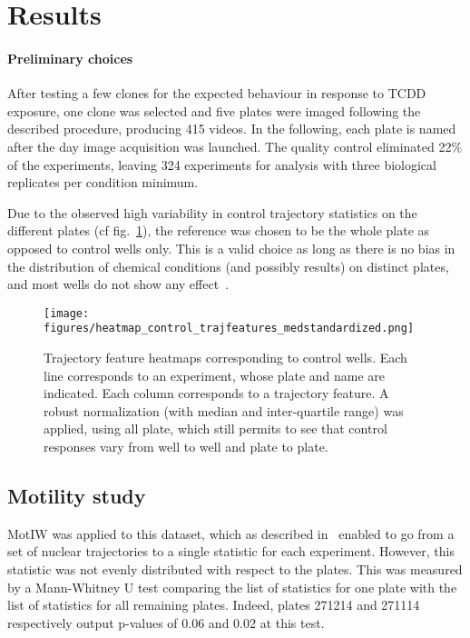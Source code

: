 \section{Results}
\paragraph{Preliminary choices}
After testing a few clones for the expected behaviour in response to TCDD exposure, one clone was selected and five plates were imaged following the described procedure, producing 415 videos. In the following, each plate is named after the day image acquisition was launched. The quality control eliminated 22\% of the experiments, leaving 324 experiments for analysis with three biological replicates per condition minimum.

Due to the observed high variability in control trajectory statistics on the different plates (cf fig.~\ref{control_heatmap}), the reference was chosen to be the whole plate as opposed to control wells only. This is a valid choice as long as there is no bias in the distribution of chemical conditions (and possibly results) on distinct plates, and most wells do not show any effect~\cite{pmid19644458}. 
\begin{figure}
\centering
\texttt{[image: figures/heatmap\_control\_trajfeatures\_medstandardized.png]}
\caption{Trajectory feature heatmaps corresponding to control wells. Each line corresponds to an experiment, whose plate and name are indicated. Each column corresponds to a trajectory feature. A robust normalization (with median and inter-quartile range) was applied, using all plate, which still permits to see that control responses vary from well to well and plate to plate.}
\label{control_heatmap}
\end{figure}

\subsection{Motility study}
\label{sec:xb_motility}
MotIW was applied to this dataset, which as described in~\cite{motiw} enabled to go from a set of nuclear trajectories to a single statistic for each experiment. However, this statistic was not evenly distributed with respect to the plates. This was measured by a Mann-Whitney U test comparing the list of statistics for one plate with the list of statistics for all remaining plates. Indeed, plates 271214 and 271114 respectively output p-values of 0.06 and 0.02 at this test.

